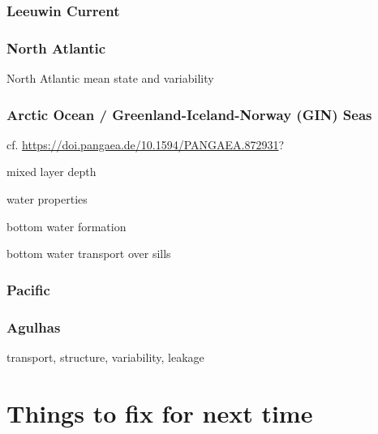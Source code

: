 \documentclass[11pt]{article}
\begin{document}
\subsubsection{Leeuwin Current}
\citet{WijeratnePattiaratchiProctor2018a}
\citet{FengZhangOkeMonselesanChamberlainMatearSchiller2016a}

\subsubsection{North Atlantic}
North Atlantic mean state \citet{DanabasogluYeagerBaileyBehrensBentsenBiBiastochBoningBozec2014a}
and variability \citet{DanabasogluYeagerKimBehrensBentsenBiBiastochBleckBoning2016a}

\subsubsection{Arctic Ocean / Greenland-Iceland-Norway (GIN) Seas}

cf. \citet{BehrendtSumataRabeSchauer2018a} \url{https://doi.pangaea.de/10.1594/PANGAEA.872931}?

mixed layer depth

water properties

bottom water formation

bottom water transport over sills

\citet{WangIlicakGerdesDrangeAksenovBaileyBentsenBiastochBozec2016b}
\citet{IlicakDrangeWangGerdesAksenovBaileyBentsenBiastochBozec2016a}

\subsubsection{Pacific}
\citet{TsengLinChenThompsonBentsenBoningBozecCassouChassignet2016a}

\subsubsection{Agulhas}
transport, structure, variability, leakage
 
 
\section{Things to fix for next time}
\end{document}
